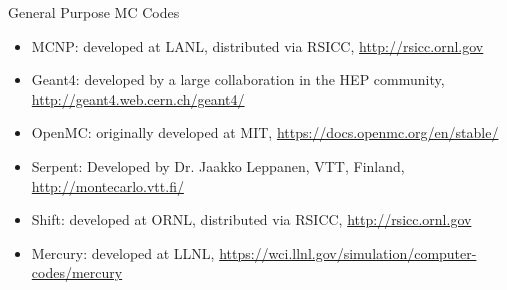 \documentclass[xcolor=x11names,compress,handout]{beamer}
\renewcommand{\(}{\begin{columns}}
\renewcommand{\)}{\end{columns}}
\newcommand{\<}[1]{\begin{column}{#1}}
\renewcommand{\>}{\end{column}}
\begin{document}
\begin{frame}{General Purpose MC Codes}

\begin{itemize}
\item \alert{MCNP}: developed at LANL, distributed via RSICC, \href{http://rsicc.ornl.gov}{http://rsicc.ornl.gov}
%

\item \alert{Geant4}: developed by a large collaboration in the HEP community, \href{ http://geant4.web.cern.ch/geant4/}{http://geant4.web.cern.ch/geant4/}

\item \alert{OpenMC}: originally developed at MIT, \href{https://docs.openmc.org/en/stable/}{https://docs.openmc.org/en/stable/}

\item \alert{Serpent}: Developed by Dr. Jaakko Leppanen, VTT, Finland, \href{ http://montecarlo.vtt.fi/}{http://montecarlo.vtt.fi/}

\item \alert{Shift}: developed at ORNL, distributed via RSICC, \href{http://rsicc.ornl.gov}{http://rsicc.ornl.gov}

\item \alert{Mercury}: developed at LLNL, \href{https://wci.llnl.gov/simulation/computer-codes/mercury}{https://wci.llnl.gov/simulation/computer-codes/mercury}

\end{itemize}

\end{frame}
\end{document}
